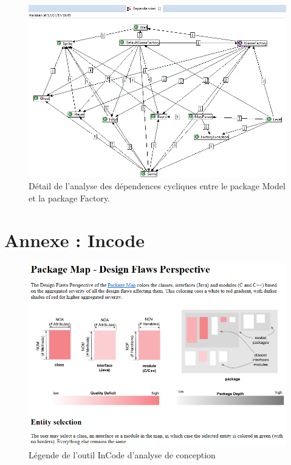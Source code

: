 \documentclass[12pt,a4paper,final]{article}
\begin{document}
\begin{figure}[ht]
	\centering
	\includegraphics[width=\textwidth]{images/DependenciesModel_Factory.png} %
	\caption{\label{dependenciesMF}Détail de l'analyse des dépendences cycliques entre le package Model et la package Factory.} %
\end{figure}


\clearpage
\newpage
\section{Annexe : Incode}\label{InCode}

\begin{figure}[ht]
	\centering
	\includegraphics[width=\textwidth]{images/InCodeDesignFlawsLegende.png}
	\caption{\label{designflawsLeg}Légende de l'outil InCode d'analyse de conception}
\end{figure}
\end{document}
